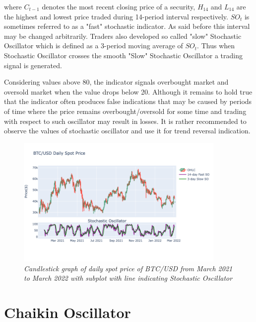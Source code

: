 where $C_{t-1}$ denotes the most recent closing price of a security, $H_{14}$ and $L_{14}$ are the highest and lowest price traded during 14-period interval respectively. $SO_{t}$ is sometimes referred to as a "fast" stochastic indicator. As said before this interval may be changed arbitrarily. Traders also developed so called "slow" Stochastic Oscillator which is defined as a 3-period moving average of $SO_{t}$. Thus when Stochastic Oscillator crosses the smooth "Slow" Stochastic Oscillator a trading signal is generated.

Considering values above 80, the indicator signals overbought market and oversold market when the value drops below 20. Although it remains to hold true that the indicator often produces false indications that may be caused by periods of time where the price remains overbought/oversold for some time and trading with respect to such oscillator may result in losses. It is rather recommended to observe the values of stochastic oscillator and use it for trend reversal indication. 

\begin{figure}[ht]

\begin{center}
	\includegraphics[width=0.9\textwidth]{Stochastic.png}
\end{center}

\caption{\textit{ Candlestick graph of daily spot price of BTC/USD from March 2021 to March 2022 with subplot with line indicating Stochastic Oscillator}}

\end{figure}

\newpage

\section{Chaikin Oscillator}

